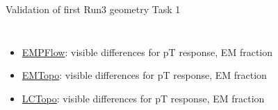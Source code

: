\begin{frame}{Validation of first Run3 geometry Task 1}
\begin{columns}
\begin{column}{0.5\textwidth}
\begin{figure}
            \end{figure}
        \end{column}
    \end{columns}
        \begin{itemize}
        \item \href{https://atlas-computing.web.cern.ch/atlas-computing/links/PhysValDir/JetEtMiss/jet_21-10-21_task2a/AntiKt4EMPFlowJets/index.html}{EMPFlow}: visible differences for pT response, EM fraction
        \item \href{https://atlas-computing.web.cern.ch/atlas-computing/links/PhysValDir/JetEtMiss/jet_21-10-21_task2a/AntiKt4EMTopoJets/index.html}{EMTopo}: visible differences for pT response, EM fraction
        \item \href{https://atlas-computing.web.cern.ch/atlas-computing/links/PhysValDir/JetEtMiss/jet_21-10-21_task2a/AntiKt4LCTopoJets/index.html}{LCTopo}: visible differences for pT response, EM fraction
    \end{itemize}
\end{frame}

